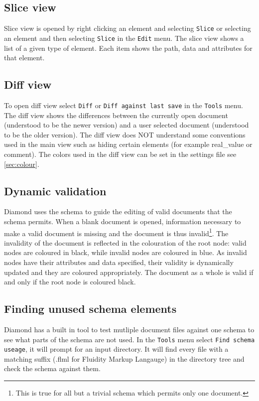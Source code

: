 \subsection{Slice view}
Slice view is opened by right clicking an element and selecting \verb+Slice+ or 
selecting an element and then selecting \verb+Slice+ in the \verb+Edit+ menu. 
The slice view shows a list of a given type of element. Each item shows the path, data and attributes for that element.

\subsection{Diff view}
To open diff view select \verb+Diff+ or \verb+Diff against last save+ in the \verb+Tools+ menu.
The diff view shows the differences between the currently open document (understood to be the newer version)
and a user selected document (understood to be the older version). The diff view does NOT understand some conventions
used in the main view such as hiding certain elements (for example real\_value or comment).
The colors used in the diff view can be set in the settings file see \ref{sec:colour}.

\subsection{Dynamic validation}
Diamond uses the schema to guide the editing of valid documents that the schema 
permits. When a blank document is opened, information necessary to make a valid
document is missing and the document is thus invalid\footnote{This is true for all
but a trivial schema which permits only one document.}. The invalidity of the document
is reflected in the colouration of the root node: valid nodes are coloured in black,
while invalid nodes are coloured in blue. As invalid nodes have their attributes
and data specified, their validity is dynamically updated and they are coloured appropriately.
The document as a whole is valid if and only if the root node is coloured black.

\subsection{Finding unused schema elements}
Diamond has a built in tool to test mutliple document files against one schema to see what parts of the schema are not used.
In the \verb+Tools+ menu select \verb+Find schema useage+, it will prompt for an input directory. It will find every file with
a matching suffix (.flml for Fluidity Markup Langauge) in the directory tree and check the schema against them.
